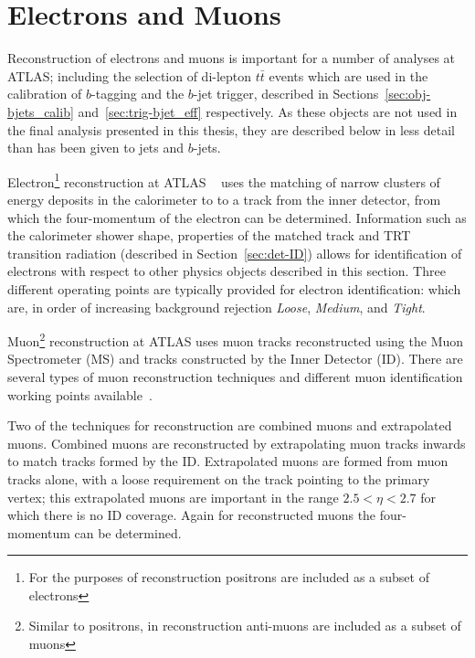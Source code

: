 
\newpage
\section{Electrons and Muons}
\label{sec:obj-leptons}

Reconstruction of electrons and muons
is important for a number of analyses at ATLAS;
including the selection of di-lepton $t\bar{t}$ events
which are used in the calibration of $b$-tagging and the $b$-jet trigger,
described in Sections~\ref{sec:obj-bjets_calib} and~\ref{sec:trig-bjet_eff} respectively.
As these objects are not used in the final analysis presented in this thesis,
they are described below in less detail than has been given to jets and $b$-jets.

Electron\footnote{For the purposes of reconstruction positrons are included as a subset of electrons}
reconstruction at ATLAS ~\cite{obj-electrons} uses
the matching of narrow clusters of energy deposits in the calorimeter to
to a track from the inner detector,
from which the four-momentum of the electron can be determined.
Information such as the calorimeter shower shape,
properties of the matched track
and TRT transition radiation (described in Section~\ref{sec:det-ID})
allows for identification of electrons with respect to other physics objects described in this section.
Three different operating points are typically provided for electron identification:
which are, in order of increasing background rejection
\textit{Loose}, \textit{Medium}, and \textit{Tight}. 

Muon\footnote{Similar to positrons, in reconstruction anti-muons are included as a subset of muons}
reconstruction at ATLAS  uses muon tracks reconstructed using the Muon Spectrometer (MS) and tracks constructed by the Inner Detector (ID).
There are several types of muon reconstruction techniques
and different muon identification working points available~\cite{obj-muons}.

Two of the techniques for reconstruction are combined muons and extrapolated muons.
Combined muons are reconstructed by extrapolating muon tracks inwards to match tracks formed by the ID.
Extrapolated muons are formed from muon tracks alone,
with a loose requirement on the track pointing to the primary vertex;
this extrapolated muons are important in the range $2.5 < \eta < 2.7$ for which there is no ID coverage.
Again for reconstructed muons the four-momentum can be determined.

